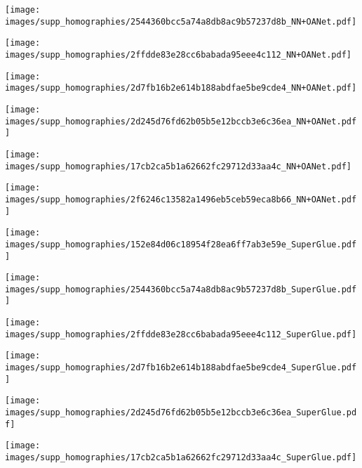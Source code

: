 \documentclass[10pt,twocolumn,letterpaper]{article}
\renewcommand{\*}[1]{\mathbf{#1}}
\newcommand{\0}{\phantom{0}}
\begin{document}
\begin{figure*}[ht!]
\begin{minipage}{\iwidth\textwidth}
    \vspace{.5mm}
    \texttt{[image: images/supp\_homographies/2544360bcc5a74a8db8ac9b57237d8b\_NN+OANet.pdf]}
    
    \vspace{.5mm}
    \texttt{[image: images/supp\_homographies/2ffdde83e28cc6babada95eee4c112\_NN+OANet.pdf]}
    
    \vspace{.5mm}
    \texttt{[image: images/supp\_homographies/2d7fb16b2e614b188abdfae5be9cde4\_NN+OANet.pdf]}
    
    \vspace{.5mm}
    \texttt{[image: images/supp\_homographies/2d245d76fd62b05b5e12bccb3e6c36ea\_NN+OANet.pdf]}
    
    \vspace{.5mm}
    \texttt{[image: images/supp\_homographies/17cb2ca5b1a62662fc29712d33aa4c\_NN+OANet.pdf]}
    
    \vspace{.5mm}
    \texttt{[image: images/supp\_homographies/2f6246c13582a1496eb5ceb59eca8b66\_NN+OANet.pdf]}
\end{minipage}\hspace{1mm}\begin{minipage}{\iwidth\textwidth}
    \texttt{[image: images/supp\_homographies/152e84d06c18954f28ea6ff7ab3e59e\_SuperGlue.pdf]}
    
    \vspace{.5mm}
    \texttt{[image: images/supp\_homographies/2544360bcc5a74a8db8ac9b57237d8b\_SuperGlue.pdf]}
    
    \vspace{.5mm}
    \texttt{[image: images/supp\_homographies/2ffdde83e28cc6babada95eee4c112\_SuperGlue.pdf]}
    
    \vspace{.5mm}
    \texttt{[image: images/supp\_homographies/2d7fb16b2e614b188abdfae5be9cde4\_SuperGlue.pdf]}
    
    \vspace{.5mm}
    \texttt{[image: images/supp\_homographies/2d245d76fd62b05b5e12bccb3e6c36ea\_SuperGlue.pdf]}
    
    \vspace{.5mm}
    \texttt{[image: images/supp\_homographies/17cb2ca5b1a62662fc29712d33aa4c\_SuperGlue.pdf]}
    

\end{minipage}
\end{figure*}
\end{document}
